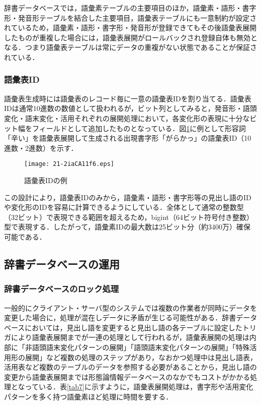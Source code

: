 \documentclass[japanese]{jnlp_1.4}
\begin{document}
辞書データベースでは，語彙素テーブルの主要項目のほか，語彙素・語形・書字形・発音形テーブルを結合した主要項目，語彙表テーブルにも一意制約が設定されているため，語彙素・語形・書字形・発音形が登録できてもその後語彙表展開したものが重複した場合には，語彙表展開がロールバックされ登録自体も無効となる．つまり語彙表テーブルは常にデータの重複がない状態であることが保証されている．


\subsubsection*{語彙表ID}

語彙表生成時には語彙表のレコード毎に一意の語彙表IDを割り当てる．語彙表IDは通常10進数の数値として扱われるが，ビット列としてみると，発音形・語頭変化・語末変化・活用それぞれの展開処理において，各変化形の表現に十分なビット幅をフィールドとして追加したものとなっている．図\ref{fig6}に例として形容詞「辛い」を語彙表展開して生成される出現書字形「がらかっ」の語彙表ID（10進数・2進数）を示す．

\begin{figure}[t]
\begin{center}
\texttt{[image: 21-2iaCA11f6.eps]}
\end{center}
\caption{語彙表IDの例}
\label{fig6}
\end{figure}

この設計により，語彙表IDのみから，語彙素・語形・書字形等の見出し語のIDや変化形のIDを容易に計算できるようにしている．全体として通常の整数型（32ビット）で表現できる範囲を超えるため，bigint（64ビット符号付き整数）型で表現する．したがって，語彙素IDの最大数は25ビット分（約3400万）確保可能である．


\subsection{辞書データベースの運用}

\subsubsection*{辞書データベースのロック処理}

一般的にクライアント・サーバ型のシステムでは複数の作業者が同時にデータを変更した場合に，処理が混在しデータに矛盾が生じる可能性がある．辞書データベースにおいては，見出し語を変更すると見出し語の各テーブルに設定したトリガにより語彙表展開までが一連の処理として行われるが，語彙表展開の処理は内部に「非語頭語末変化パターンの展開」「語頭語末変化パターンの展開」「特殊活用形の展開」など複数の処理のステップがあり，なおかつ処理中は見出し語表，活用表など複数のテーブルのデータを参照する必要があることから，見出し語の変更から語彙表展開までは形態論情報データベースのなかでもコストがかかる処理となっている．表\ref{tab7}に示すように，語彙表展開処理は，書字形や活用変化パターンを多く持つ語彙素ほど処理に時間を要する．
\end{document}

